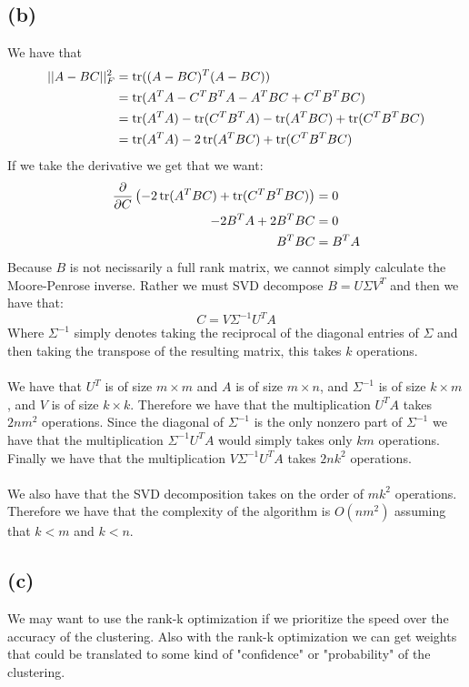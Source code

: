 \documentclass[11pt]{article}
\begin{document}
\subsection*{(b)}
We have that 
\begin{align*}
    ||A-BC||_F^2 &= \trace((A-BC)^T(A-BC))\\
    &= \trace(A^TA-C^TB^TA-A^TBC+C^TB^TBC)\\
    &= \trace(A^TA)-\trace(C^TB^TA)-\trace(A^TBC)+\trace(C^TB^TBC)\\
    &= \trace(A^TA)-2\trace(A^TBC)+\trace(C^TB^TBC)
\end{align*}
If we take the derivative we get that we want:
\begin{align*}
    \frac{\partial}{\partial C}\left(-2\trace(A^TBC)+\trace(C^TB^TBC)\right) &=0\\
    -2B^TA+2B^TBC&=0\\
    B^TBC&=B^TA
\end{align*}
Because $B$ is not necissarily a full rank matrix, we cannot simply calculate the 
Moore-Penrose inverse. Rather we must SVD decompose $B=U\Sigma V^T$ and then we have that:
$$C = V\Sigma^{-1}U^TA$$
Where $\Sigma^{-1}$ simply denotes taking the reciprocal of the diagonal entries of $\Sigma$ and then 
taking the transpose of the resulting matrix, this takes $k$ operations.\\\\
We have that $U^T$ is of size $m\times m$ and $A$ is of size $m\times n$, and 
$\Sigma^{-1}$ is of size $k\times m$, and $V$ is of size $k\times k$. Therefore we have that
the multiplication $U^TA$ takes $2nm^2$ operations. Since the diagonal of $\Sigma^{-1}$ is
the only nonzero part of $\Sigma^{-1}$ we have that the multiplication $\Sigma^{-1}U^TA$ would
simply takes only $km$ operations. Finally we have that the multiplication $V\Sigma^{-1}U^TA$
takes $2nk^2$ operations.\\\\
We also have that the SVD decomposition takes on the order of $mk^2$ operations. Therefore we have that 
the complexity of the algorithm is $\boxed{O(nm^2)}$ assuming that $k<m$ and $k<n$.
\subsection*{(c)}
We may want to use the rank-k optimization if we prioritize the speed 
over the accuracy of the clustering. Also with the rank-k optimization we can 
get weights that could be translated to some kind of "confidence" or "probability" of 
the clustering.
\end{document}
